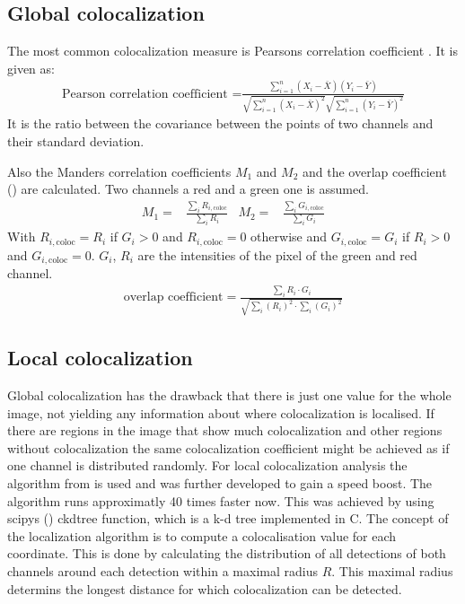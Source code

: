 \subsection{Global colocalization}
The most common colocalization measure is Pearsons correlation coefficient \cite{pearson}. It is given as:
\begin{align}
\text{Pearson correlation coefficient =}\frac{\sum ^n _{i=1}(X_i - \bar{X})(Y_i - \bar{Y})}{\sqrt{\sum ^n _{i=1}(X_i - \bar{X})^2} \sqrt{\sum ^n _{i=1}(Y_i - \bar{Y})^2}}
\end{align}
It is the ratio between the covariance between the points of two channels and their standard deviation.\newline

Also the Manders correlation coefficients $M_1$ and $M_2$ and the overlap coefficient (\cite{manders}) are calculated. Two channels a red and a green one is assumed.
\begin{align}
M_1 =& \frac{\sum_i R_{i,\text{coloc}}}{\sum_i R_i}&M_2 = & \frac{\sum_i G_{i,\text{coloc}}}{\sum_i G_i}
\end{align}
With $R_{i,\text{coloc}} = R_i$ if $G_i >0$ and $R_{i,\text{coloc}} = 0$ otherwise and $G_{i,\text{coloc}} = G_i$ if $R_i >0$ and $G_{i,\text{coloc}} = 0$. $G_i$, $R_i$ are the intensities of the pixel of the green and red channel.
\begin{align}
\text{overlap coefficient} = \frac{\sum_i R_i \cdot G_i}{\sqrt{\sum_i \left(R_i\right)^2 \cdot \sum_i \left(G_i\right)^2}}
\end{align}

\subsection{Local colocalization}
Global colocalization has the drawback that there is just one value for the whole image, not yielding any information about where colocalization is localised. If there are regions in the image that show much colocalization and other regions without colocalization the same colocalization coefficient might be achieved as if one channel is distributed randomly.\newline
For local colocalization analysis the algorithm from \cite{coloc} is used and was further developed to gain a speed boost. The algorithm runs approximatly 40 times faster now. This was achieved by using scipys (\cite{scipy}) ckdtree function, which is a k-d tree implemented in C.\newline
The concept of the localization algorithm is to compute a colocalisation value for each coordinate. This is done by calculating the distribution of all detections of both channels around each detection within a maximal radius $R$. This maximal radius determins the longest distance for which colocalization can be detected.\newline

